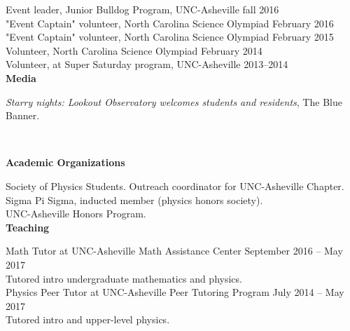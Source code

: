 \documentclass[letterpaper, 11pt]{article}
\newcommand{\noi}{\noindent}
\begin{document}
\noi Event leader, Junior Bulldog Program, UNC-Asheville \hfill fall 2016 
\\

\noi "Event Captain" volunteer, North Carolina Science Olympiad \hfill February 2016
\\

\noi "Event Captain" volunteer, North Carolina Science Olympiad \hfill February 2015
\\

\noi Volunteer, North Carolina Science Olympiad \hfill February 2014
\\

\noi Volunteer, at Super Saturday program, UNC-Asheville \hfill 2013--2014
\\

\noi \textbf{Media}

\noi \emph{Starry nights: Lookout Observatory welcomes students and residents}, The Blue Banner.
\begin{sloppypar}
\noi {}
\\
\end{sloppypar}

\noi \textbf{Academic Organizations}

\noi Society of Physics Students. Outreach coordinator for UNC-Asheville Chapter.
\\

\noi Sigma Pi Sigma, inducted member (physics honors society).
\\

\noi UNC-Asheville Honors Program.
\\

\noi \textbf{Teaching}

\noi Math Tutor at UNC-Asheville Math Assistance Center \hfill September 2016 -- May 2017
\\
Tutored intro undergraduate mathematics and physics.
\\

\noi Physics Peer Tutor at UNC-Asheville Peer Tutoring Program \hfill July 2014 -- May 2017
\\
Tutored intro and upper-level physics.
\\
\end{document}
